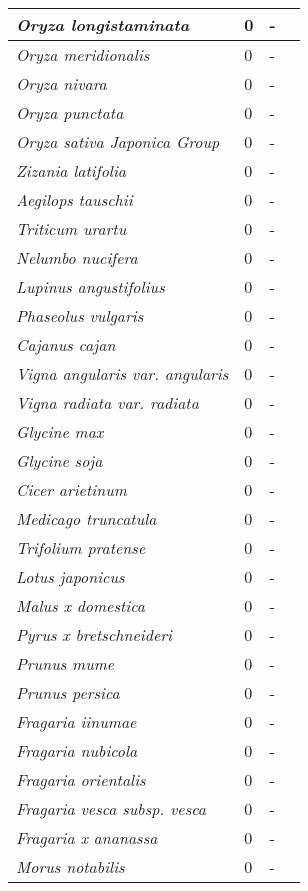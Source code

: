 {\begin{longtable}{| L{4cm} | L{2cm}  | L{5cm} | L{4cm} |}
\textit{Oryza longistaminata}& 0 & - & \\ \hline
\textit{Oryza meridionalis} & 0 & - & \\ \hline
\textit{Oryza nivara} & 0 & - & \\ \hline
\textit{Oryza punctata} & 0 & - & \\ \hline
\textit{Oryza sativa Japonica Group} & 0 & - & \\ \hline
\textit{Zizania latifolia} & 0 & - & \\ \hline
\textit{Aegilops tauschii} & 0 & - & \\ \hline
\textit{Triticum urartu} & 0 & - & \\ \hline
\textit{Nelumbo nucifera} & 0 & - & \\ \hline
\textit{Lupinus angustifolius} & 0 & - & \\ \hline
\textit{Phaseolus vulgaris} & 0 & - & \\ \hline
\textit{Cajanus cajan} & 0 & - & \\ \hline
\textit{Vigna angularis var. angularis} & 0 & - & \\ \hline
\textit{Vigna radiata var. radiata} & 0 & - & \\ \hline
\textit{Glycine max} & 0 & - & \\ \hline
\textit{Glycine soja} & 0 & - & \\ \hline
\textit{Cicer arietinum} & 0 & - & \\ \hline
\textit{Medicago truncatula} & 0 & - & \\ \hline
\textit{Trifolium pratense} & 0 & - & \\ \hline
\textit{Lotus japonicus} & 0 & - & \\ \hline
\textit{Malus x domestica} & 0 & - & \\ \hline
\textit{Pyrus x bretschneideri} & 0 & - & \\ \hline
\textit{Prunus mume} & 0 & - & \\ \hline
\textit{Prunus persica} & 0 & - & \\ \hline
\textit{Fragaria iinumae} & 0 & - & \\ \hline
\textit{Fragaria nubicola} & 0 & - & \\ \hline
\textit{Fragaria orientalis} & 0 & - & \\ \hline
\textit{Fragaria vesca subsp. vesca} & 0 & - & \\ \hline
\textit{Fragaria x ananassa} & 0 & - & \\ \hline
\textit{Morus notabilis} & 0 & - & \\ \hline

\end{longtable}}
